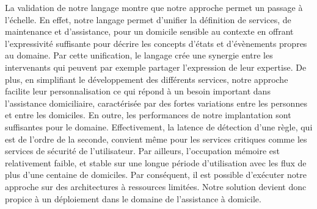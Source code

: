 

La validation de notre langage montre que notre approche permet un passage à l'échelle. En effet, notre langage permet d'unifier la définition de services, de maintenance et d'assistance, pour un domicile sensible au contexte en offrant l'expressivité suffisante pour décrire les concepts d'états et d'évènements propres au domaine. 
Par cette unification, le langage crée une synergie entre les intervenants 
qui peuvent par exemple partager l'expression de leur expertise. 
De plus, en simplifiant le développement des différents services, notre approche facilite leur personnalisation ce qui répond à un besoin important dans l'assistance domiciliaire, caractérisée par des fortes variations entre les personnes et entre les domiciles.
En outre, les performances de notre implantation sont suffisantes pour le domaine.  Effectivement, la latence de détection d'une règle, qui est de l'ordre de la seconde, convient même pour les services critiques comme les services de sécurité de l'utilisateur. Par ailleurs, l'occupation mémoire est relativement faible, et stable sur une longue période d'utilisation avec les flux de plus d'une centaine de domiciles. Par conséquent, il est possible d'exécuter notre approche sur des architectures à ressources limitées. Notre solution devient donc propice \`a un déploiement dans le domaine de l'assistance à domicile.  \newline


